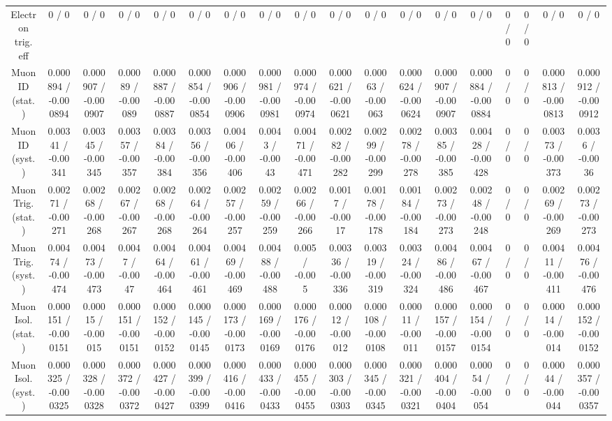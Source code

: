 \documentclass[10pt]{article}
\begin{document}
\begin{table}[htbp]
\begin{center}
\begin{tabular}{|c|c|c|c|c|c|c|c|c|c|c|c|c|c|c|c|c|c|}
  Electron trig. eff & 0 / 0 & 0 / 0 & 0 / 0 & 0 / 0 & 0 / 0 & 0 / 0 & 0 / 0 & 0 / 0 & 0 / 0 & 0 / 0 & 0 / 0 & 0 / 0 & 0 / 0 & 0 / 0 & 0 / 0 & 0 / 0 & 0 / 0 \\ 
  Muon ID (stat.) & 0.000894 / -0.000894 & 0.000907 / -0.000907 & 0.00089 / -0.00089 & 0.000887 / -0.000887 & 0.000854 / -0.000854 & 0.000906 / -0.000906 & 0.000981 / -0.000981 & 0.000974 / -0.000974 & 0.000621 / -0.000621 & 0.00063 / -0.00063 & 0.000624 / -0.000624 & 0.000907 / -0.000907 & 0.000884 / -0.000884 & 0 / 0 & 0 / 0 & 0.000813 / -0.000813 & 0.000912 / -0.000912 \\ 
  Muon ID (syst.) & 0.00341 / -0.00341 & 0.00345 / -0.00345 & 0.00357 / -0.00357 & 0.00384 / -0.00384 & 0.00356 / -0.00356 & 0.00406 / -0.00406 & 0.0043 / -0.0043 & 0.00471 / -0.00471 & 0.00282 / -0.00282 & 0.00299 / -0.00299 & 0.00278 / -0.00278 & 0.00385 / -0.00385 & 0.00428 / -0.00428 & 0 / 0 & 0 / 0 & 0.00373 / -0.00373 & 0.0036 / -0.0036 \\ 
  Muon Trig. (stat.) & 0.00271 / -0.00271 & 0.00268 / -0.00268 & 0.00267 / -0.00267 & 0.00268 / -0.00268 & 0.00264 / -0.00264 & 0.00257 / -0.00257 & 0.00259 / -0.00259 & 0.00266 / -0.00266 & 0.0017 / -0.0017 & 0.00178 / -0.00178 & 0.00184 / -0.00184 & 0.00273 / -0.00273 & 0.00248 / -0.00248 & 0 / 0 & 0 / 0 & 0.00269 / -0.00269 & 0.00273 / -0.00273 \\ 
  Muon Trig. (syst.) & 0.00474 / -0.00474 & 0.00473 / -0.00473 & 0.0047 / -0.0047 & 0.00464 / -0.00464 & 0.00461 / -0.00461 & 0.00469 / -0.00469 & 0.00488 / -0.00488 & 0.005 / -0.005 & 0.00336 / -0.00336 & 0.00319 / -0.00319 & 0.00324 / -0.00324 & 0.00486 / -0.00486 & 0.00467 / -0.00467 & 0 / 0 & 0 / 0 & 0.00411 / -0.00411 & 0.00476 / -0.00476 \\ 
  Muon Isol. (stat.) & 0.000151 / -0.000151 & 0.00015 / -0.00015 & 0.000151 / -0.000151 & 0.000152 / -0.000152 & 0.000145 / -0.000145 & 0.000173 / -0.000173 & 0.000169 / -0.000169 & 0.000176 / -0.000176 & 0.00012 / -0.00012 & 0.000108 / -0.000108 & 0.00011 / -0.00011 & 0.000157 / -0.000157 & 0.000154 / -0.000154 & 0 / 0 & 0 / 0 & 0.00014 / -0.00014 & 0.000152 / -0.000152 \\ 
  Muon Isol. (syst.) & 0.000325 / -0.000325 & 0.000328 / -0.000328 & 0.000372 / -0.000372 & 0.000427 / -0.000427 & 0.000399 / -0.000399 & 0.000416 / -0.000416 & 0.000433 / -0.000433 & 0.000455 / -0.000455 & 0.000303 / -0.000303 & 0.000345 / -0.000345 & 0.000321 / -0.000321 & 0.000404 / -0.000404 & 0.00054 / -0.00054 & 0 / 0 & 0 / 0 & 0.00044 / -0.00044 & 0.000357 / -0.000357 \\ 

\end{tabular}
\end{center}
\end{table}
\end{document}
